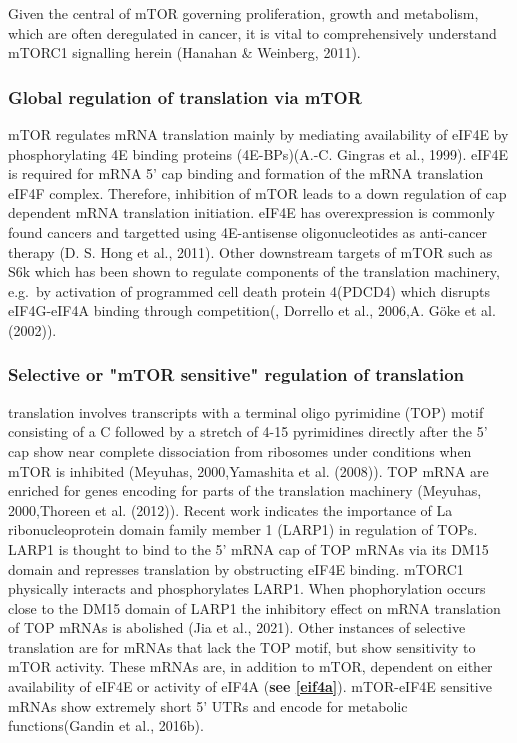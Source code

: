 \documentclass[12pt,openany]{book}
\begin{document}
Given the central of mTOR governing proliferation, growth and
metabolism, which are often deregulated in cancer, it is vital to
comprehensively understand mTORC1 signalling herein (Hanahan \&
Weinberg, 2011).

\subsubsection{Global regulation of translation via mTOR}

mTOR regulates mRNA translation mainly by mediating availability of
eIF4E by phosphorylating 4E binding proteins (4E-BPs)(A.-C. Gingras et
al., 1999). eIF4E is required for mRNA 5' cap binding and formation of
the mRNA translation eIF4F complex. Therefore, inhibition of mTOR leads
to a down regulation of cap dependent mRNA translation initiation. eIF4E
has overexpression is commonly found cancers and targetted using
4E-antisense oligonucleotides as anti-cancer therapy (D. S. Hong et al.,
2011). Other downstream targets of mTOR such as S6k which has been shown
to regulate components of the translation machinery, e.g.~by activation
of programmed cell death protein 4(PDCD4) which disrupts eIF4G-eIF4A
binding through competition(, Dorrello et al., 2006,A. Göke et al.
(2002)).

\subsubsection{Selective or "mTOR sensitive" regulation of translation}

translation involves transcripts with a terminal oligo pyrimidine (TOP)
motif consisting of a C followed by a stretch of 4-15 pyrimidines
directly after the 5' cap show near complete dissociation from ribosomes
under conditions when mTOR is inhibited (Meyuhas, 2000,Yamashita et al.
(2008)). TOP mRNA are enriched for genes encoding for parts of the
translation machinery (Meyuhas, 2000,Thoreen et al. (2012)). Recent work
indicates the importance of La ribonucleoprotein domain family member 1
(LARP1) in regulation of TOPs. LARP1 is thought to bind to the 5' mRNA
cap of TOP mRNAs via its DM15 domain and represses translation by
obstructing eIF4E binding. mTORC1 physically interacts and
phosphorylates LARP1. When phophorylation occurs close to the DM15
domain of LARP1 the inhibitory effect on mRNA translation of TOP mRNAs
is abolished (Jia et al., 2021). Other instances of selective
translation are for mRNAs that lack the TOP motif, but show sensitivity
to mTOR activity. These mRNAs are, in addition to mTOR, dependent on
either availability of eIF4E or activity of eIF4A (\textbf{see
\ref{eif4a}}). mTOR-eIF4E sensitive mRNAs show extremely short 5' UTRs
and encode for metabolic functions(Gandin et al., 2016b).
\end{document}
